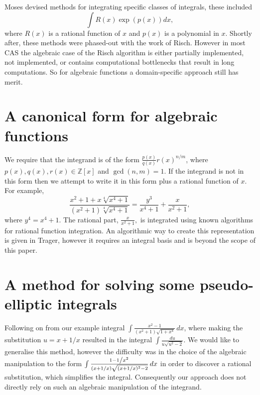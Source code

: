 \documentclass[12pt]{article}
\numberwithin{equation}{section}
\theoremstyle{definition}
\begin{document}
Moses devised methods for integrating specific classes of integrals, these 
included $$\int R(x) \exp(p(x)) dx,$$ where $R(x)$ is a rational function of $x$ and $p(x)$ 
is a polynomial in $x$\cite[pp. 85]{Moses1967}. Shortly after, these methods were 
phased-out with the work of Risch. However in most CAS the algebraic case of the Risch 
algorithm is either partially implemented, not implemented, or contains computational 
bottlenecks that result in long computations. So for algebraic functions a domain-specific 
approach still has merit. 

\section{A canonical form for algebraic functions}
We require that the integrand is of the form $\frac{p(x)}{q(x)}r(x)^{n/m}$, where 
$p(x),q(x),r(x)\in \mathbb{Z}[x]$ and $\gcd (n,m)=1$. If the integrand is not in this form 
then we attempt to write it in this form plus a rational function of $x$. For example, 
$$\frac{x^2+1+x\sqrt[4]{x^4+1}}{\left(x^2+1\right) \sqrt[4]{x^4+1}} = 
\frac{y^3}{x^4+1}+\frac{x}{x^2+1},$$
where $y^4 = x^4+1$. The rational part, $\frac{x}{x^2+1},$ is integrated using known algorithms for rational 
function integration\cite{Bronstein1997}. An algorithmic way to create this representation is given in 
Trager\cite{Trager1984}, however it requires an integral basis and is beyond the scope of this paper. \\

\section{A method for solving some pseudo-elliptic integrals}

Following on from our example integral $\int \frac{x^2-1}{\left(x^2+1\right)\sqrt{1+x^4}} \, dx$, 
where making the substitution $u=x+1/x$ resulted in the integral $\int \frac{du}{u\sqrt{u^2-2}}$. 
We would like to generalise this method, however the difficulty was in the choice of the algebraic 
manipulation to the form 
$\int\frac{1-1\left/x^2\right.}{(x+1/x)\sqrt{(x+1/x)^2-2}} \, dx$ in order to discover a rational 
substitution, which simplifies the integral. Consequently our approach does not directly rely 
on such an algebraic manipulation of the integrand. \\
\end{document}
